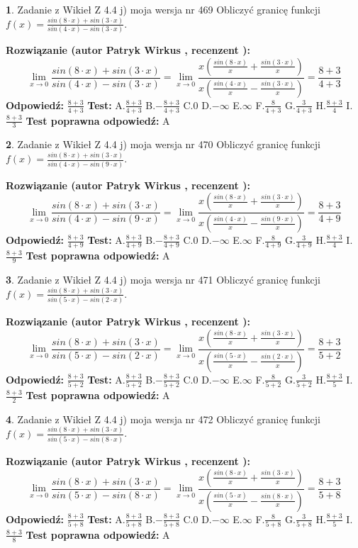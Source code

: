 \documentclass[12pt, a4paper]{article}
\theoremstyle{definition} %
\newtheorem{zad}{}
\newcommand{\zadStart}[1]{\begin{zad}#1\newline}
\newcommand{\zadStop}{\end{zad}}
\newcommand{\rozwStart}[2]{\noindent \textbf{Rozwiązanie (autor #1 , recenzent #2): }\newline}
\newcommand{\rozwStop}{\newline}
\newcommand{\odpStart}{\noindent \textbf{Odpowiedź:}\newline}
\newcommand{\odpStop}{\newline}
\newcommand{\testStart}{\noindent \textbf{Test:}\newline}
\newcommand{\testStop}{\newline}
\newcommand{\kluczStart}{\noindent \textbf{Test poprawna odpowiedź:}\newline}
\newcommand{\kluczStop}{\newline}
\begin{document}
\zadStart{Zadanie z Wikieł Z 4.4 j) moja wersja nr 469}
Obliczyć granicę funkcji $f(x)=\frac{sin(8\cdot x) +sin(3\cdot x)}{sin(4\cdot x) -sin(3\cdot x)}$.
\zadStop
\rozwStart{Patryk Wirkus}{}
$$\lim\limits_{x\to 0}\frac{sin(8\cdot x) +sin(3\cdot x)}{sin(4\cdot x) -sin(3\cdot x)}=\lim\limits_{x\to 0}\frac{x(\frac{sin(8\cdot x)}{x}+\frac{sin(3\cdot x)}{x})}{x(\frac{sin(4\cdot x)}{x}-\frac{sin(3\cdot x)}{x})}=\frac{8+3}{4+3}$$
\rozwStop
\odpStart
$\frac{8+3}{4+3}$
\odpStop
\testStart
A.$\frac{8+3}{4+3}$
B.$-\frac{8+3}{4+3}$
C.$0$
D.$-\infty$
E.$\infty$
F.$\frac{8}{4+3}$
G.$\frac{3}{4+3}$
H.$\frac{8+3}{4}$
I.$\frac{8+3}{3}$
\testStop
\kluczStart
A
\kluczStop



\zadStart{Zadanie z Wikieł Z 4.4 j) moja wersja nr 470}
Obliczyć granicę funkcji $f(x)=\frac{sin(8\cdot x) +sin(3\cdot x)}{sin(4\cdot x) -sin(9\cdot x)}$.
\zadStop
\rozwStart{Patryk Wirkus}{}
$$\lim\limits_{x\to 0}\frac{sin(8\cdot x) +sin(3\cdot x)}{sin(4\cdot x) -sin(9\cdot x)}=\lim\limits_{x\to 0}\frac{x(\frac{sin(8\cdot x)}{x}+\frac{sin(3\cdot x)}{x})}{x(\frac{sin(4\cdot x)}{x}-\frac{sin(9\cdot x)}{x})}=\frac{8+3}{4+9}$$
\rozwStop
\odpStart
$\frac{8+3}{4+9}$
\odpStop
\testStart
A.$\frac{8+3}{4+9}$
B.$-\frac{8+3}{4+9}$
C.$0$
D.$-\infty$
E.$\infty$
F.$\frac{8}{4+9}$
G.$\frac{3}{4+9}$
H.$\frac{8+3}{4}$
I.$\frac{8+3}{9}$
\testStop
\kluczStart
A
\kluczStop



\zadStart{Zadanie z Wikieł Z 4.4 j) moja wersja nr 471}
Obliczyć granicę funkcji $f(x)=\frac{sin(8\cdot x) +sin(3\cdot x)}{sin(5\cdot x) -sin(2\cdot x)}$.
\zadStop
\rozwStart{Patryk Wirkus}{}
$$\lim\limits_{x\to 0}\frac{sin(8\cdot x) +sin(3\cdot x)}{sin(5\cdot x) -sin(2\cdot x)}=\lim\limits_{x\to 0}\frac{x(\frac{sin(8\cdot x)}{x}+\frac{sin(3\cdot x)}{x})}{x(\frac{sin(5\cdot x)}{x}-\frac{sin(2\cdot x)}{x})}=\frac{8+3}{5+2}$$
\rozwStop
\odpStart
$\frac{8+3}{5+2}$
\odpStop
\testStart
A.$\frac{8+3}{5+2}$
B.$-\frac{8+3}{5+2}$
C.$0$
D.$-\infty$
E.$\infty$
F.$\frac{8}{5+2}$
G.$\frac{3}{5+2}$
H.$\frac{8+3}{5}$
I.$\frac{8+3}{2}$
\testStop
\kluczStart
A
\kluczStop



\zadStart{Zadanie z Wikieł Z 4.4 j) moja wersja nr 472}
Obliczyć granicę funkcji $f(x)=\frac{sin(8\cdot x) +sin(3\cdot x)}{sin(5\cdot x) -sin(8\cdot x)}$.
\zadStop
\rozwStart{Patryk Wirkus}{}
$$\lim\limits_{x\to 0}\frac{sin(8\cdot x) +sin(3\cdot x)}{sin(5\cdot x) -sin(8\cdot x)}=\lim\limits_{x\to 0}\frac{x(\frac{sin(8\cdot x)}{x}+\frac{sin(3\cdot x)}{x})}{x(\frac{sin(5\cdot x)}{x}-\frac{sin(8\cdot x)}{x})}=\frac{8+3}{5+8}$$
\rozwStop
\odpStart
$\frac{8+3}{5+8}$
\odpStop
\testStart
A.$\frac{8+3}{5+8}$
B.$-\frac{8+3}{5+8}$
C.$0$
D.$-\infty$
E.$\infty$
F.$\frac{8}{5+8}$
G.$\frac{3}{5+8}$
H.$\frac{8+3}{5}$
I.$\frac{8+3}{8}$
\testStop
\kluczStart
A
\kluczStop
\end{document}
